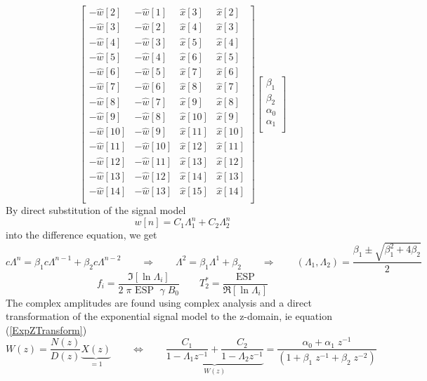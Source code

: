 \documentclass[10pt]{amsart}
\begin{document}
{\[\begin{bmatrix}
 -\hat{w}[ 2] & -\hat{w}[ 1] & \hat{x}[ 3] & \hat{x}[ 2] \\
 -\hat{w}[ 3] & -\hat{w}[ 2] & \hat{x}[ 4] & \hat{x}[ 3] \\
 -\hat{w}[ 4] & -\hat{w}[ 3] & \hat{x}[ 5] & \hat{x}[ 4] \\
 -\hat{w}[ 5] & -\hat{w}[ 4] & \hat{x}[ 6] & \hat{x}[ 5] \\
 -\hat{w}[ 6] & -\hat{w}[ 5] & \hat{x}[ 7] & \hat{x}[ 6] \\
 -\hat{w}[ 7] & -\hat{w}[ 6] & \hat{x}[ 8] & \hat{x}[ 7] \\
 -\hat{w}[ 8] & -\hat{w}[ 7] & \hat{x}[ 9] & \hat{x}[ 8] \\
 -\hat{w}[ 9] & -\hat{w}[ 8] & \hat{x}[10] & \hat{x}[ 9] \\
 -\hat{w}[10] & -\hat{w}[ 9] & \hat{x}[11] & \hat{x}[10] \\
 -\hat{w}[11] & -\hat{w}[10] & \hat{x}[12] & \hat{x}[11] \\
 -\hat{w}[12] & -\hat{w}[11] & \hat{x}[13] & \hat{x}[12] \\
 -\hat{w}[13] & -\hat{w}[12] & \hat{x}[14] & \hat{x}[13] \\
 -\hat{w}[14] & -\hat{w}[13] & \hat{x}[15] & \hat{x}[14] \\
\end{bmatrix}
\begin{bmatrix}
  \beta_1  \\
  \beta_2  \\
  \alpha_0 \\
  \alpha_1 \\
\end{bmatrix}
\]
		  }
By direct substitution of the signal model 
\[
  w[n] = C_1 \Lambda_1^n  +  C_2 \Lambda_2^n 
\]
into the difference equation, we get
\[
  c \Lambda^n  = \beta_1 c \Lambda^{n-1} + \beta_2 c \Lambda^{n-2}
\qquad \Rightarrow \qquad
   \Lambda^2  = \beta_1 \Lambda^1 + \beta_2
\qquad \Rightarrow \qquad
   (\Lambda_1,\Lambda_2)  = \frac{\beta_1  \pm \sqrt{\beta_1^2 + 4\beta_2}}{2}
\]
\[
 f_i = \frac{\Im [\ln \Lambda_i]}{2 \; \pi  \text{ ESP }\; \gamma \; B_0}
\qquad
 T_2^* = \frac{\text{ESP}}{\Re [\ln \Lambda_i]}
\]
The complex amplitudes are found using complex analysis and a direct
transformation of the exponential signal model to the z-domain,
ie equation (\ref{ExpZTransform})
\[
W(z)=  \frac{N(z)}{D(z)} \underbrace{X(z)}_{=1}
\qquad
\Leftrightarrow
\qquad
\underbrace{
 \frac{C_1}{1-\Lambda_1 z^{-1}}
     + 
 \frac{C_2}{1-\Lambda_2 z^{-1}}
}_{W(z)}
    = 
 \frac{\alpha_0+\alpha_1 \; z^{-1}}{ ( 1 + \beta_1\; z^{-1}+  \beta_2 \; z^{-2})}
\]
\end{document}
